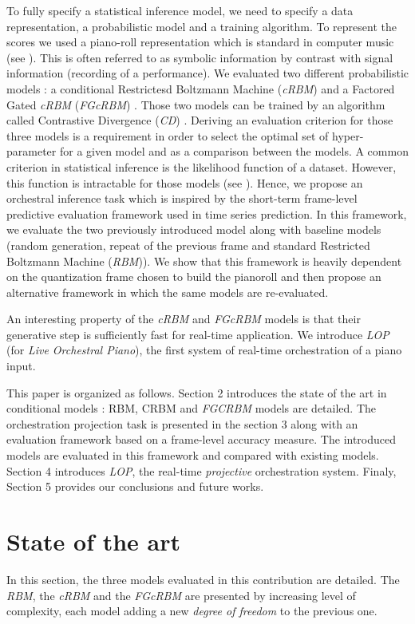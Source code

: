 \documentclass[letterpaper]{article}
\begin{document}
To fully specify a statistical inference model, we need to specify a data representation, a probabilistic model and a training algorithm.
To represent the scores we used a piano-roll representation which is standard in computer music (see ). This is often referred to as symbolic information by contrast with signal information (recording of a performance). We evaluated two different probabilistic models : a conditional Restrictesd Boltzmann Machine (\textit{cRBM}) and a Factored Gated \textit{cRBM} (\textit{FGcRBM}) \cite{taylor2009factored}. Those two models can be trained by an algorithm called Contrastive Divergence (\textit{CD}) \cite{carreira2005contrastive}.
Deriving an evaluation criterion for those three models is a requirement in order to select the optimal set of hyper-parameter for a given model and as a comparison between the models. A common criterion in statistical inference is the likelihood function of a dataset. However, this function is intractable for those models (see ). Hence, we propose an orchestral inference task which is inspired by the short-term frame-level predictive evaluation framework used in time series prediction. 
In this framework, we evaluate the two previously introduced model along with baseline models (random generation, repeat of the previous frame and standard Restricted Boltzmann Machine (\textit{RBM})).
We show that this framework is heavily dependent on the quantization frame chosen to build the pianoroll and then propose an alternative framework in which the same models are re-evaluated.

An interesting property of the \textit{cRBM} and \textit{FGcRBM} models is that their generative step is sufficiently fast for real-time application. We introduce \textit{LOP} (for \textit{Live Orchestral Piano}), the first system of real-time orchestration of a piano input.

This paper is organized as follows. Section 2 introduces the state of the art in conditional models : RBM, CRBM and \textit{FGCRBM} models are detailed. The orchestration projection task is presented in the section 3 along with an evaluation framework based on a frame-level accuracy measure. The introduced models are evaluated in this framework and compared with existing models. Section 4 introduces \textit{LOP}, the real-time \textit{projective} orchestration system. Finaly, Section 5 provides our conclusions and future works.

\section{State of the art}
\label{sec:state_of_the_art}
In this section, the three models evaluated in this contribution are detailed. The \textit{RBM}, the \textit{cRBM} and the \textit{FGcRBM} are presented by increasing level of complexity, each model adding a new \textit{degree of freedom} to the previous one.
\end{document}
